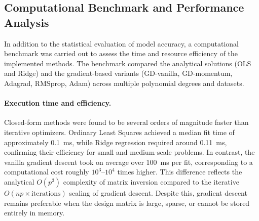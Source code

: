 \documentclass[
    article
 reprint,            %
 amsmath,amssymb,
 aps,
]{revtex4-2}
\begin{document}
\subsection{Computational Benchmark and Performance Analysis}
\label{sec:Computational_Benchmark}

In addition to the statistical evaluation of model accuracy, a computational benchmark was carried out to assess the time and resource efficiency of the implemented methods. 
The benchmark compared the analytical solutions (OLS and Ridge) and the gradient-based variants (GD-vanilla, GD-momentum, Adagrad, RMSprop, Adam) across multiple polynomial degrees and datasets. 

\paragraph*{Execution time and efficiency.}
Closed-form methods were found to be several orders of magnitude faster than iterative optimizers.
Ordinary Least Squares achieved a median fit time of approximately 0.1~ms, while Ridge regression required around 0.11~ms, confirming their efficiency for small and medium-scale problems. 
In contrast, the vanilla gradient descent took on average over 100~ms per fit, corresponding to a computational cost roughly $10^3$--$10^4$ times higher.
This difference reflects the analytical $O(p^3)$ complexity of matrix inversion compared to the iterative $O(n p \times \text{iterations})$ scaling of gradient descent.
Despite this, gradient descent remains preferable when the design matrix is large, sparse, or cannot be stored entirely in memory.


\end{document}
